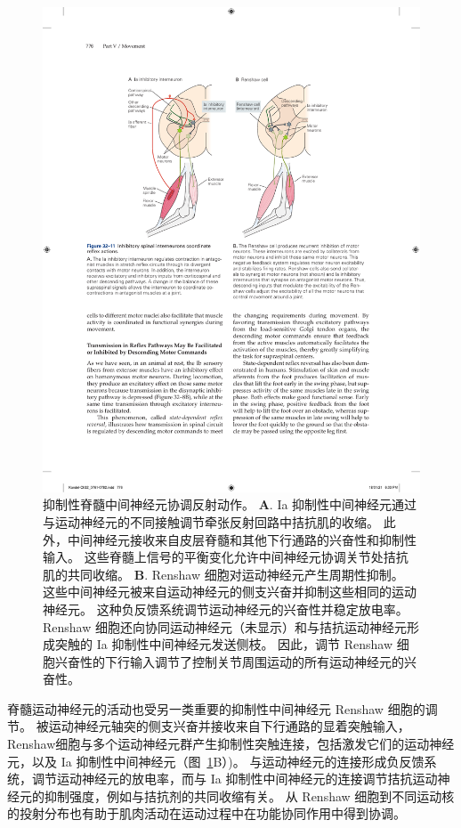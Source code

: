 \begin{figure}[htbp]
	\centering
	\includegraphics[width=0.75\linewidth]{chap32/fig_32_11}
	\caption{抑制性脊髓中间神经元协调反射动作。
	\textbf{A}. Ia 抑制性中间神经元通过与运动神经元的不同接触调节牵张反射回路中拮抗肌的收缩。
	此外，中间神经元接收来自皮层脊髓和其他下行通路的兴奋性和抑制性输入。
	这些脊髓上信号的平衡变化允许中间神经元协调关节处拮抗肌的共同收缩。
	\textbf{B}. Renshaw 细胞对运动神经元产生周期性抑制。
	这些中间神经元被来自运动神经元的侧支兴奋并抑制这些相同的运动神经元。
	这种负反馈系统调节运动神经元的兴奋性并稳定放电率。
	Renshaw 细胞还向协同运动神经元（未显示）和与拮抗运动神经元形成突触的 Ia 抑制性中间神经元发送侧枝。
	因此，调节 Renshaw 细胞兴奋性的下行输入调节了控制关节周围运动的所有运动神经元的兴奋性。}
	\label{fig:32_11}
\end{figure}


脊髓运动神经元的活动也受另一类重要的抑制性中间神经元 Renshaw 细胞的调节。
被运动神经元轴突的侧支兴奋并接收来自下行通路的显着突触输入，Renshaw细胞与多个运动神经元群产生抑制性突触连接，包括激发它们的运动神经元，以及 Ia 抑制性中间神经元（图~\ref{fig:32_11}B）)。
与运动神经元的连接形成负反馈系统，调节运动神经元的放电率，而与 Ia 抑制性中间神经元的连接调节拮抗运动神经元的抑制强度，例如与拮抗剂的共同收缩有关。
从 Renshaw 细胞到不同运动核的投射分布也有助于肌肉活动在运动过程中在功能协同作用中得到协调。



